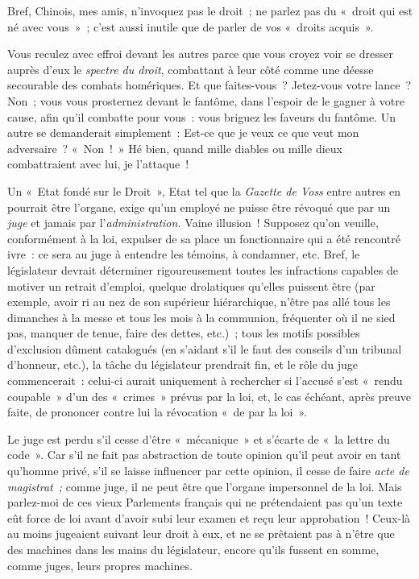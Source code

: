 \documentclass[french,twoside]{book} %
\begin{document}
Bref, Chinois, mes amis, n’invoquez pas le droit ; ne parlez pas du « droit qui est né avec vous » ; c’est aussi inutile que de parler de vos « droits acquis ».\par
Vous reculez avec effroi devant les autres parce que vous croyez voir se dresser auprès d’eux le \emph{spectre du droit}, combattant à leur côté comme une déesse secourable des combats homériques. Et que faites-vous ? Jetez-vous votre lance ? Non ; vous vous prosternez devant le fantôme, dans l’espoir de le gagner à votre cause, afin qu’il combatte pour vous : vous briguez les faveurs du fantôme. Un autre se demanderait simplement : Est-ce que je veux ce que veut mon adversaire ? « Non ! » Hé bien, quand mille diables ou mille dieux combattraient avec lui, je l’attaque !\par
Un « Etat fondé sur le Droit », Etat tel que la \emph{Gazette de Voss} entre autres en pourrait être l’organe, exige qu’un employé ne puisse être révoqué que par un \emph{juge} et jamais par l’\emph{administration.} Vaine illusion ! Supposez qu’on veuille, conformément à la loi, expulser de sa place un fonctionnaire qui a été rencontré ivre : ce sera au juge à entendre les témoins, à condamner, etc. Bref, le législateur devrait déterminer rigoureusement toutes les infractions capables de  motiver un retrait d’emploi, quelque drolatiques qu’elles puissent être (par exemple, avoir ri au nez de son supérieur hiérarchique, n’être pas allé tous les dimanches à la messe et tous les mois à la communion, fréquenter où il ne sied pas, manquer de tenue, faire des dettes, etc.) ; tous les motifs possibles d’exclusion dûment catalogués (en s’aidant s’il le faut des conseils d’un tribunal d’honneur, etc.), la tâche du législateur prendrait fin, et le rôle du juge commencerait : celui-ci aurait uniquement à rechercher si l’accusé s’est « rendu coupable » d’un des « crimes » prévus par la loi, et, le cas échéant, après preuve faite, de prononcer contre lui la révocation « de par la loi ».\par
Le juge est perdu s’il cesse d’être « mécanique » et s’écarte de « la lettre du code ». Car s’il ne fait pas abstraction de toute opinion qu’il peut avoir en tant qu’homme privé, s’il se laisse influencer par cette opinion, il cesse de faire \emph{acte de magistrat ;} comme juge, il ne peut être que l’organe impersonnel de la loi. Mais parlez-moi de ces vieux Parlements français qui ne prétendaient pas qu’un texte eût force de loi avant d’avoir subi leur examen et reçu leur approbation ! Ceux-là au moins jugeaient suivant leur droit à eux, et ne se prêtaient pas à n’être que des machines dans les mains du législateur, encore qu’ils fussent en somme, comme juges, leurs propres machines.\par
\end{document}

